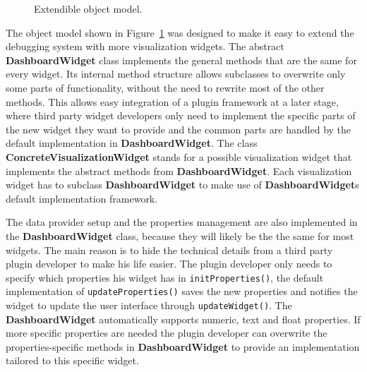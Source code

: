 \begin{figure}%
  \centering
  \caption{Extendible object model.}
  \label{class overview}
\end{figure}

The object model shown in Figure~\ref{class overview} was designed to make it easy to extend the debugging system with more visualization widgets. The abstract \textbf{DashboardWidget} class implements the general methods that are the same for every widget. Its internal method structure allows subclasses to overwrite only some parts of functionality, without the need to rewrite most of the other methods. This allows easy integration of a plugin framework at a later stage, where third party widget developers only need to implement the specific parts of the new widget they want to provide and the common parts are handled by the default implementation in \textbf{DashboardWidget}. The class \textbf{ConcreteVisualizationWidget} stands for a possible visualization widget that implements the abstract methods from \textbf{DashboardWidget}. Each visualization widget has to subclass \textbf{DashboardWidget} to make use of \textbf{DashboardWidget}s default implementation framework.

The data provider setup and the properties management are also implemented in the \textbf{DashboardWidget} class, because they will likely be the the same for most widgets. The main reason is to hide the technical details from a third party plugin developer to make his life easier. The plugin developer only needs to specify which properties his widget has in \verb+initProperties()+, the default implementation of \verb+updateProperties()+ saves the new properties and notifies the widget to update the user interface through \verb+updateWidget()+. The \textbf{DashboardWidget} automatically supports numeric, text and float properties. If more specific properties are needed the plugin developer can overwrite the properties-specific methods in \textbf{DashboardWidget} to provide an implementation tailored to this specific widget.

